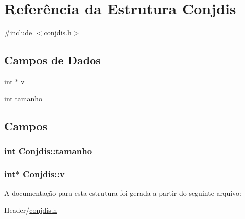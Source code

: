 \hypertarget{structConjdis}{
\section{Referência da Estrutura Conjdis}
\label{structConjdis}
}


{\ttfamily \#include $<$conjdis.h$>$}

\subsection*{Campos de Dados}
\begin{DoxyCompactItemize}
\item 
int $\ast$ \hyperlink{structConjdis_a614d243337303331bf14ee7c3099d96a}{v}
\item 
int \hyperlink{structConjdis_afd546d61be7639ad6802214badc77b78}{tamanho}
\end{DoxyCompactItemize}


\subsection{Campos}
\hypertarget{structConjdis_afd546d61be7639ad6802214badc77b78}{
\subsubsection[{tamanho}]{\setlength{\rightskip}{0pt plus 5cm}int {\bf Conjdis::tamanho}}}
\label{structConjdis_afd546d61be7639ad6802214badc77b78}
\hypertarget{structConjdis_a614d243337303331bf14ee7c3099d96a}{
\subsubsection[{v}]{\setlength{\rightskip}{0pt plus 5cm}int$\ast$ {\bf Conjdis::v}}}
\label{structConjdis_a614d243337303331bf14ee7c3099d96a}


A documentação para esta estrutura foi gerada a partir do seguinte arquivo:\begin{DoxyCompactItemize}
\item 
Header/\hyperlink{conjdis_8h}{conjdis.h}\end{DoxyCompactItemize}
